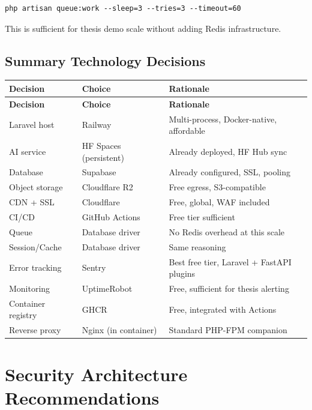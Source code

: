 \documentclass[12pt,a4paper]{report}
\begin{document}
\begin{lstlisting}
php artisan queue:work --sleep=3 --tries=3 --timeout=60
\end{lstlisting}

This is sufficient for thesis demo scale without adding Redis
infrastructure.

\section{Summary Technology Decisions}

\begin{longtable}{L{3cm} L{3.5cm} L{5.5cm}}
    \toprule
    \textbf{Decision} & \textbf{Choice} & \textbf{Rationale} \\
    \midrule
    \endfirsthead
    \toprule
    \textbf{Decision} & \textbf{Choice} & \textbf{Rationale} \\
    \midrule
    \endhead
    \bottomrule
    \endlastfoot

    Laravel host & Railway & Multi-process, Docker-native, affordable \\[4pt]
    AI service & HF Spaces (persistent) & Already deployed, HF Hub sync \\[4pt]
    Database & Supabase & Already configured, SSL, pooling \\[4pt]
    Object storage & Cloudflare R2 & Free egress, S3-compatible \\[4pt]
    CDN + SSL & Cloudflare & Free, global, WAF included \\[4pt]
    CI/CD & GitHub Actions & Free tier sufficient \\[4pt]
    Queue & Database driver & No Redis overhead at this scale \\[4pt]
    Session/Cache & Database driver & Same reasoning \\[4pt]
    Error tracking & Sentry & Best free tier, Laravel + FastAPI plugins \\[4pt]
    Monitoring & UptimeRobot & Free, sufficient for thesis alerting \\[4pt]
    Container registry & GHCR & Free, integrated with Actions \\[4pt]
    Reverse proxy & Nginx (in container) & Standard PHP-FPM companion \\

\end{longtable}

\chapter{Security Architecture Recommendations}
\label{ch:security}
\end{document}
